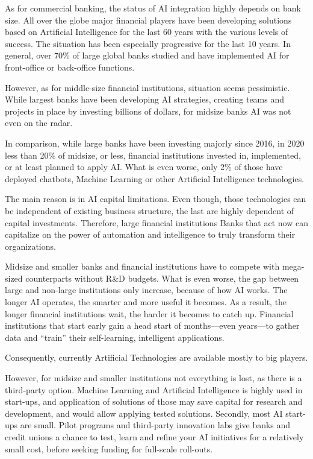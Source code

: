 As for commercial banking, the status of AI integration highly depends on bank size.
All over the globe major financial players have been developing solutions based on Artificial Intelligence for the last 60 years with the various levels of success.
The situation has been especially progressive for the last 10 years.
In general, over 70\% of large global banks studied and have implemented AI for front-office or back-office functions.
\cite{deloitte_thriving_in_ai_era}

However, as for middle-size financial institutions, situation seems pessimistic.
While largest banks have been developing AI strategies, creating teams and projects in place by investing billions of dollars, for midsize banks AI was not even on the radar.

In comparison, while large banks have been investing majorly since 2016, in 2020 less than 20\% of midsize, or less, financial institutions invested in, implemented, or at least planned to apply AI.
What is even worse, only 2\% of those have deployed chatbots, Machine Learning or other Artificial Intelligence technologies.
\cite{ai_transform_disrupt}

The main reason is in AI capital limitations.
Even though, those technologies can be independent of existing business structure, the last are highly dependent of capital investments.
Therefore, large financial institutions Banks that act now can capitalize on the power of automation and intelligence to truly transform their organizations.


Midsize and smaller banks and financial institutions have to compete with mega-sized counterparts without R\&D budgets.
What is even worse, the gap between large and non-large institutions only increase, because of how AI works.
The longer AI operates, the smarter and more useful it becomes.
As a result, the longer financial institutions wait, the harder it becomes to catch up. 
Financial institutions that start early gain a head start of months—even years—to gather data and “train” their self-learning, intelligent applications. 


Consequently, currently Artificial Technologies are available mostly to big players.

However, for midsize and smaller institutions not everything is lost, as there is a third-party option.
Machine Learning and Artificial Intelligence is highly used in start-ups, and application of solutions of those may save capital for research and development, and would allow applying tested solutions.
Secondly, most AI start-ups are small. 
Pilot programs and third-party innovation labs give banks and credit unions a chance to test, learn and refine your AI initiatives for a relatively small cost, before seeking funding for full-scale roll-outs.


